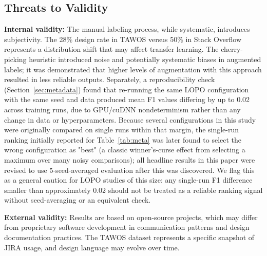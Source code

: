 \documentclass[preprint,12pt]{elsarticle}
\begin{document}
\subsection{Threats to Validity}
\label{sec:threats}

\textbf{Internal validity:} The manual labeling process, while systematic, introduces subjectivity. The 28\% design rate in TAWOS versus 50\% in Stack Overflow represents a distribution shift that may affect transfer learning. The cherry-picking heuristic introduced noise and potentially systematic biases in augmented labels; it was demonstrated that higher levels of augmentation with this approach resulted in less reliable outputs. Separately, a reproducibility check (Section~\ref{sec:metadata}) found that re-running the same LOPO configuration with the same seed and data produced mean F1 values differing by up to 0.02 across training runs, due to GPU/cuDNN nondeterminism rather than any change in data or hyperparameters. Because several configurations in this study were originally compared on single runs within that margin, the single-run ranking initially reported for Table~\ref{tab:meta} was later found to select the wrong configuration as "best" (a classic winner's-curse effect from selecting a maximum over many noisy comparisons); all headline results in this paper were revised to use 5-seed-averaged evaluation after this was discovered. We flag this as a general caution for LOPO studies of this size: any single-run F1 difference smaller than approximately 0.02 should not be treated as a reliable ranking signal without seed-averaging or an equivalent check.

\textbf{External validity:} Results are based on open-source projects, which may differ from proprietary software development in communication patterns and design documentation practices. The TAWOS dataset represents a specific snapshot of JIRA usage, and design language may evolve over time.
\end{document}
